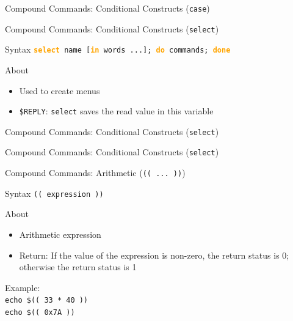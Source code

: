 \documentclass[10pt, compress, aspectratio=169]{beamer}
\begin{document}
\begin{frame}{Compound Commands: Conditional Constructs (\texttt{case})}
  
\end{frame}

\begin{frame}{Compound Commands: Conditional Constructs (\texttt{select})}
  \begin{alertblock}{Syntax}
    \texttt{\textbf{\textcolor{orange}{select}} name
            {[}\textbf{\textcolor{orange}{in}} words ...{]};
            \textbf{\textcolor{orange}{do}}
            commands;
            \textbf{\textcolor{orange}{done}}
            }
  \end{alertblock}
  \begin{exampleblock}{About}
    \begin{itemize}
      \item Used to create menus
      \item \texttt{\$REPLY}: \texttt{select} saves the read value in this
            variable
    \end{itemize}
  \end{exampleblock}
\end{frame}

\begin{frame}{Compound Commands: Conditional Constructs (\texttt{select})}
  
\end{frame}

\begin{frame}{Compound Commands: Conditional Constructs (\texttt{select})}
  
\end{frame}

\begin{frame}{Compound Commands: Arithmetic (\texttt{(( ... ))})}
  \begin{alertblock}{Syntax}
    \texttt{(( expression ))}
  \end{alertblock}
  \begin{exampleblock}{About}
    \begin{itemize}
      \item Arithmetic expression
      \item Return: If the value of the expression is non-zero, the return
            status is 0; otherwise the return status is 1
    \end{itemize}
  \end{exampleblock}
  Example: \\
  \texttt{echo \$(( 33 * 40 ))} \\
  \texttt{echo \$(( 0x7A ))}
\end{frame}
\end{document}
